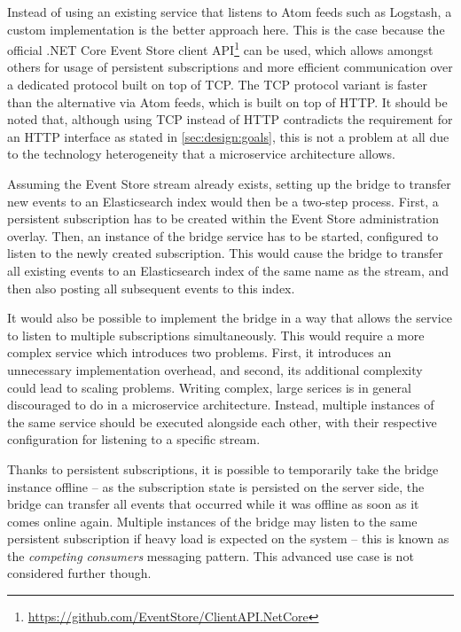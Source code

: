 Instead of using an existing service that listens to Atom feeds such as Logstash, a custom implementation is the better approach here.
This is the case because the official .NET Core Event Store client \ac{API}\footnote{\url{https://github.com/EventStore/ClientAPI.NetCore}} can be used, which allows amongst others for usage of persistent subscriptions and more efficient communication over a dedicated protocol built on top of \ac{TCP}.
The \ac{TCP} protocol variant is faster than the alternative via Atom feeds, which is built on top of \ac{HTTP}\cite{WEB:EvtSt-Which-Api}.
It should be noted that, although using \ac{TCP} instead of \ac{HTTP} contradicts the requirement for an \ac{HTTP} interface as stated in \cref{sec:design:goals}, this is not a problem at all due to the technology heterogeneity that a microservice architecture allows\cite[Key Benefits,pp.~4f]{newman2015building}.

Assuming the Event Store stream already exists, setting up the bridge to transfer new events to an Elasticsearch index would then be a two-step process.
First, a persistent subscription has to be created within the Event Store administration overlay.
Then, an instance of the bridge service has to be started, configured to listen to the newly created subscription.
This would cause the bridge to transfer all existing events to an Elasticsearch index of the same name as the stream, and then also posting all subsequent events to this index.

It would also be possible to implement the bridge in a way that allows the service to listen to multiple subscriptions simultaneously.
This would require a more complex service which introduces two problems.
First, it introduces an unnecessary implementation overhead, and second, its additional complexity could lead to scaling problems.
Writing complex, large serices is in general discouraged to do in a microservice architecture\cite[Key Benefits,pp.~5f]{newman2015building}.
Instead, multiple instances of the same service should be executed alongside each other, with their respective configuration for listening to a specific stream.

Thanks to persistent subscriptions, it is possible to temporarily take the bridge instance offline -- as the subscription state is persisted on the server side, the bridge can transfer all events that occurred while it was offline as soon as it comes online again.
Multiple instances of the bridge may listen to the same persistent subscription if heavy load is expected on the system -- this is known as the \emph{competing consumers} messaging pattern\cite{WEB:Microsoft-Competing-Consumers}.
This advanced use case is not considered further though.

